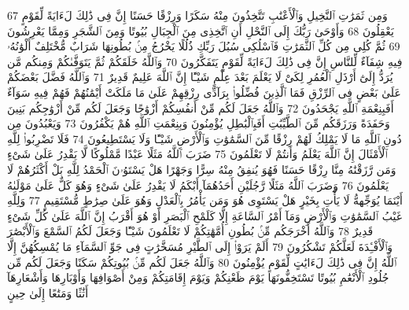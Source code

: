 {\tiny\colorbox{cl_aya}{67}} وَمِن ثَمَرَٰتِ ٱلنَّخِيلِ وَٱلْأَعْنَٰبِ تَتَّخِذُونَ مِنْهُ سَكَرًا وَرِزْقًا حَسَنًا إِنَّ فِى ذَٰلِكَ لَءَايَةً لِّقَوْمٍ يَعْقِلُونَ
{\tiny\colorbox{cl_aya}{68}} وَأَوْحَىٰ رَبُّكَ إِلَى ٱلنَّحْلِ أَنِ ٱتَّخِذِى مِنَ ٱلْجِبَالِ بُيُوتًا وَمِنَ ٱلشَّجَرِ وَمِمَّا يَعْرِشُونَ
{\tiny\colorbox{cl_aya}{69}} ثُمَّ كُلِى مِن كُلِّ ٱلثَّمَرَٰتِ فَٱسْلُكِى سُبُلَ رَبِّكِ ذُلُلًا يَخْرُجُ مِنۢ بُطُونِهَا شَرَابٌ مُّخْتَلِفٌ أَلْوَٰنُهُۥ فِيهِ شِفَآءٌ لِّلنَّاسِ إِنَّ فِى ذَٰلِكَ لَءَايَةً لِّقَوْمٍ يَتَفَكَّرُونَ
{\tiny\colorbox{cl_aya}{70}} وَٱللَّهُ خَلَقَكُمْ ثُمَّ يَتَوَفَّىٰكُمْ وَمِنكُم مَّن يُرَدُّ إِلَىٰٓ أَرْذَلِ ٱلْعُمُرِ لِكَىْ لَا يَعْلَمَ بَعْدَ عِلْمٍ شَيْـًٔا إِنَّ ٱللَّهَ عَلِيمٌ قَدِيرٌ
{\tiny\colorbox{cl_aya}{71}} وَٱللَّهُ فَضَّلَ بَعْضَكُمْ عَلَىٰ بَعْضٍ فِى ٱلرِّزْقِ فَمَا ٱلَّذِينَ فُضِّلُوا۟ بِرَآدِّى رِزْقِهِمْ عَلَىٰ مَا مَلَكَتْ أَيْمَٰنُهُمْ فَهُمْ فِيهِ سَوَآءٌ أَفَبِنِعْمَةِ ٱللَّهِ يَجْحَدُونَ
{\tiny\colorbox{cl_aya}{72}} وَٱللَّهُ جَعَلَ لَكُم مِّنْ أَنفُسِكُمْ أَزْوَٰجًا وَجَعَلَ لَكُم مِّنْ أَزْوَٰجِكُم بَنِينَ وَحَفَدَةً وَرَزَقَكُم مِّنَ ٱلطَّيِّبَٰتِ أَفَبِٱلْبَٰطِلِ يُؤْمِنُونَ وَبِنِعْمَتِ ٱللَّهِ هُمْ يَكْفُرُونَ
{\tiny\colorbox{cl_aya}{73}} وَيَعْبُدُونَ مِن دُونِ ٱللَّهِ مَا لَا يَمْلِكُ لَهُمْ رِزْقًا مِّنَ ٱلسَّمَٰوَٰتِ وَٱلْأَرْضِ شَيْـًٔا وَلَا يَسْتَطِيعُونَ
{\tiny\colorbox{cl_aya}{74}} فَلَا تَضْرِبُوا۟ لِلَّهِ ٱلْأَمْثَالَ إِنَّ ٱللَّهَ يَعْلَمُ وَأَنتُمْ لَا تَعْلَمُونَ
{\tiny\colorbox{cl_aya}{75}} ضَرَبَ ٱللَّهُ مَثَلًا عَبْدًا مَّمْلُوكًا لَّا يَقْدِرُ عَلَىٰ شَىْءٍ وَمَن رَّزَقْنَٰهُ مِنَّا رِزْقًا حَسَنًا فَهُوَ يُنفِقُ مِنْهُ سِرًّا وَجَهْرًا هَلْ يَسْتَوُۥنَ ٱلْحَمْدُ لِلَّهِ بَلْ أَكْثَرُهُمْ لَا يَعْلَمُونَ
{\tiny\colorbox{cl_aya}{76}} وَضَرَبَ ٱللَّهُ مَثَلًا رَّجُلَيْنِ أَحَدُهُمَآ أَبْكَمُ لَا يَقْدِرُ عَلَىٰ شَىْءٍ وَهُوَ كَلٌّ عَلَىٰ مَوْلَىٰهُ أَيْنَمَا يُوَجِّههُّ لَا يَأْتِ بِخَيْرٍ هَلْ يَسْتَوِى هُوَ وَمَن يَأْمُرُ بِٱلْعَدْلِ وَهُوَ عَلَىٰ صِرَٰطٍ مُّسْتَقِيمٍ
{\tiny\colorbox{cl_aya}{77}} وَلِلَّهِ غَيْبُ ٱلسَّمَٰوَٰتِ وَٱلْأَرْضِ وَمَآ أَمْرُ ٱلسَّاعَةِ إِلَّا كَلَمْحِ ٱلْبَصَرِ أَوْ هُوَ أَقْرَبُ إِنَّ ٱللَّهَ عَلَىٰ كُلِّ شَىْءٍ قَدِيرٌ
{\tiny\colorbox{cl_aya}{78}} وَٱللَّهُ أَخْرَجَكُم مِّنۢ بُطُونِ أُمَّهَٰتِكُمْ لَا تَعْلَمُونَ شَيْـًٔا وَجَعَلَ لَكُمُ ٱلسَّمْعَ وَٱلْأَبْصَٰرَ وَٱلْأَفْـِٔدَةَ لَعَلَّكُمْ تَشْكُرُونَ
{\tiny\colorbox{cl_aya}{79}} أَلَمْ يَرَوْا۟ إِلَى ٱلطَّيْرِ مُسَخَّرَٰتٍ فِى جَوِّ ٱلسَّمَآءِ مَا يُمْسِكُهُنَّ إِلَّا ٱللَّهُ إِنَّ فِى ذَٰلِكَ لَءَايَٰتٍ لِّقَوْمٍ يُؤْمِنُونَ
{\tiny\colorbox{cl_aya}{80}} وَٱللَّهُ جَعَلَ لَكُم مِّنۢ بُيُوتِكُمْ سَكَنًا وَجَعَلَ لَكُم مِّن جُلُودِ ٱلْأَنْعَٰمِ بُيُوتًا تَسْتَخِفُّونَهَا يَوْمَ ظَعْنِكُمْ وَيَوْمَ إِقَامَتِكُمْ وَمِنْ أَصْوَافِهَا وَأَوْبَارِهَا وَأَشْعَارِهَآ أَثَٰثًا وَمَتَٰعًا إِلَىٰ حِينٍ

